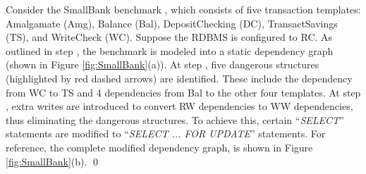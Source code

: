 \begin{example}
\label{exa:oaofsb}
Consider the SmallBank benchmark \cite{DBLP:conf/icde/AlomariCFR08}, which consists of five transaction templates: Amalgamate (Amg), Balance (Bal), DepositChecking (DC), TransactSavings (TS), and WriteCheck (WC). Suppose the RDBMS is configured to RC.
As outlined in step , the benchmark is modeled into a static dependency graph (shown in Figure \ref{fig:SmallBank}(a)). 
At step , five dangerous structures (highlighted by red dashed arrows) are identified. These include the dependency from WC to TS and 4 dependencies from Bal to the other four templates. 
At step , extra writes are introduced to convert RW dependencies to WW dependencies, thus eliminating the dangerous structures.
To achieve this, certain ``\textit{SELECT}'' statements are modified to ``\textit{SELECT ... FOR UPDATE}'' statements. 
For reference, the complete modified dependency graph, is shown in Figure \ref{fig:SmallBank}(b).
\qed
\end{example}




